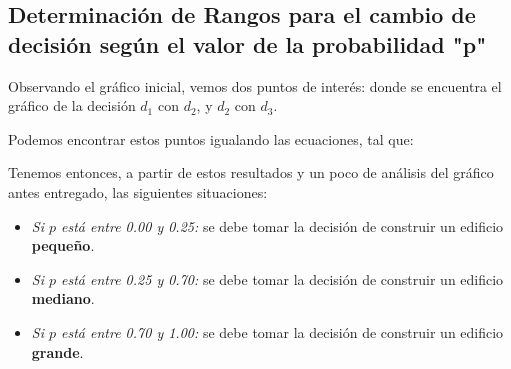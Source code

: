\begin{figure}[!h]
    \centering
\end{figure}


\subsection[Rangos para el cambio de Decisión]{Determinación de Rangos para el cambio de decisión según el valor de la probabilidad "p"}
Observando el gráfico inicial, vemos dos puntos de interés: donde se encuentra el gráfico de la decisión $d_1$ con $d_2$, y $d_2$ con $d_3$.

Podemos encontrar estos puntos igualando las ecuaciones, tal que:



Tenemos entonces, a partir de estos resultados y un poco de análisis del gráfico antes entregado, las siguientes situaciones:

\begin{itemize}
    \item \textit{Si $p$ está entre 0.00 y 0.25: } se debe tomar la decisión de construir un edificio \textbf{pequeño}.
    \item \textit{Si $p$ está entre 0.25 y 0.70: } se debe tomar la decisión de construir un edificio \textbf{mediano}.
    \item \textit{Si $p$ está entre 0.70 y 1.00: } se debe tomar la decisión de construir un edificio \textbf{grande}.
\end{itemize}

\pagebreak